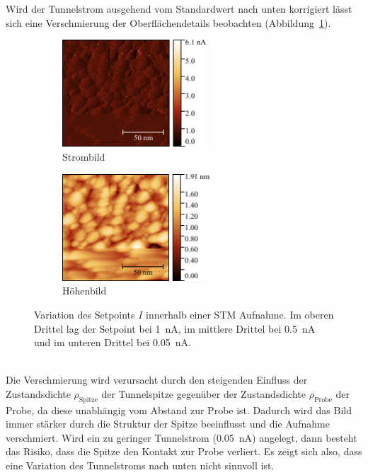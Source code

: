 \documentclass[a4paper,twoside,final]{article}
\begin{document}
Wird der Tunnelstrom ausgehend vom Standardwert nach unten korrigiert lässt sich eine Verschmierung der Oberflächendetails beobachten (Abbildung~\ref{fig:Stromvariation_2}).
\begin{figure}[htp]
    \centering
    \begin{subfigure}{0.45\textwidth}
        \includegraphics[height=4cm]{Bilder/Image01959_Stromvariation_Strom.pdf}
        \caption{Strombild}
    \end{subfigure}
    \hspace{0.5cm}
    \begin{subfigure}{0.45\textwidth}
        \includegraphics[height=4cm]{Bilder/Image01959_Stromvariation.pdf}
        \caption{Höhenbild}
    \end{subfigure}
    \caption{Variation des Setpoints $I$ innerhalb einer STM Aufnahme. Im oberen Drittel lag der Setpoint bei \SI{1}{\nano\ampere}, im mittlere Drittel bei \SI{0.5}{\nano\ampere} und im unteren Drittel bei \SI{0.05}{\nano\ampere}.}
    \label{fig:Stromvariation_2}
\end{figure}\\
Die Verschmierung wird verursacht durch den steigenden Einfluss der Zustandsdichte $\rho_\text{Spitze}$ der Tunnelspitze gegenüber der Zustandsdichte $\rho_\text{Probe}$ der Probe, da diese unabhängig vom Abstand zur Probe ist. Dadurch wird das Bild immer stärker durch die Struktur der Spitze beeinflusst und die Aufnahme verschmiert. Wird ein zu geringer Tunnelstrom (\SI{0.05}{\nano\ampere}) angelegt, dann besteht das Risiko, dass die Spitze den Kontakt zur Probe verliert. Es zeigt sich also, dass eine Variation des Tunnelstroms nach unten nicht sinnvoll ist.
\end{document}
